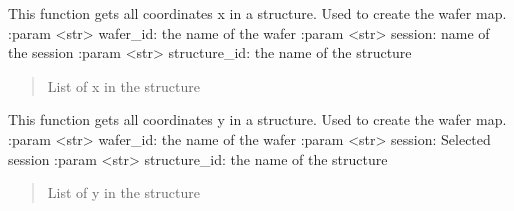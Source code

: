 \documentclass[letterpaper,10pt,english]{sphinxmanual}
\begin{document}
\begin{fulllineitems}
\label{\detokenize{VBD:VBD.get_all_x}}
\pysigstartsignatures
{}
\pysigstopsignatures
\sphinxAtStartPar
This function gets all coordinates x in a structure. Used to create the wafer map.
:param \textless{}str\textgreater{} wafer\_id: the name of the wafer
:param \textless{}str\textgreater{} session: name of the session
:param \textless{}str\textgreater{} structure\_id: the name of the structure
\begin{quote}\begin{description}
\sphinxAtStartPar
List of x in the structure

\end{description}\end{quote}

\end{fulllineitems}


\begin{fulllineitems}
\label{\detokenize{VBD:VBD.get_all_y}}
\pysigstartsignatures
{}
\pysigstopsignatures
\sphinxAtStartPar
This function gets all coordinates y in a structure. Used to create the wafer map.
:param \textless{}str\textgreater{} wafer\_id: the name of the wafer
:param \textless{}str\textgreater{} session: Selected session
:param \textless{}str\textgreater{} structure\_id: the name of the structure
\begin{quote}\begin{description}
\sphinxAtStartPar
List of y in the structure

\end{description}\end{quote}

\end{fulllineitems}

\end{document}
